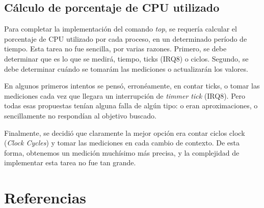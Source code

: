 \documentclass[a4paper,10pt]{article}
\begin{document}
      \subsection{Cálculo de porcentaje de CPU utilizado}
      Para completar la implementación del comando \textit{top}, se requería calcular el porcentaje de CPU utilizado por cada proceso, en un determinado
      período de tiempo. Esta tarea no fue sencilla, por varias razones. Primero, se debe determinar que es lo que se medirá, tiempo, ticks (IRQ8) o ciclos. 
      Segundo, se debe determinar cuándo se tomarám las mediciones o actualizarán los valores. 

      En algunos primeros intentos se pensó, erronéamente, en contar ticks, o tomar las mediciones cada vez que llegara un interrupción de \textit{timmer tick} (IRQ8).
      Pero todas esas propuestas tenían alguna falla de algún tipo: o eran aproximaciones, o sencillamente no respondían al objetivo buscado.

      Finalmente, se decidió que claramente la mejor opción era contar ciclos clock (\textit{Clock Cycles}) y tomar las mediciones en cada cambio de contexto.
      De esta forma, obtenemos un medición muchísimo más precisa, y la complejidad de implementar esta tarea no fue tan grande.

\newpage     
\section{Referencias}
\end{document}
